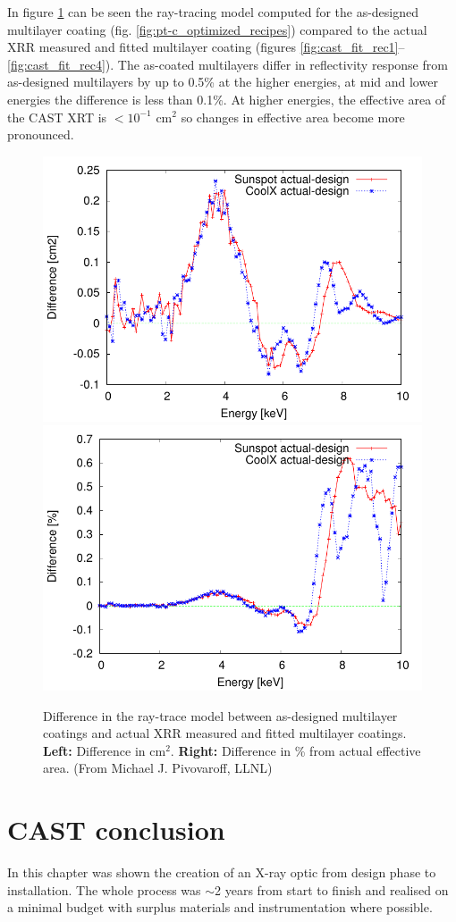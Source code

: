 In figure \ref{fig:raytracing3} can be seen the ray-tracing model computed for the as-designed multilayer coating (fig. \ref{fig:pt-c_optimized_recipes}) compared to the actual XRR measured and fitted multilayer coating (figures \ref{fig:cast_fit_rec1}--\ref{fig:cast_fit_rec4}). The as-coated multilayers differ in reflectivity response from as-designed multilayers by up to 0.5\% at the higher energies, at mid and lower energies the difference is less than 0.1\%. At higher energies, the effective area of the CAST XRT is  $< 10^{-1}$ cm$^2$ so changes in effective area become more pronounced.

\begin{figure}[htbp]
  \centering
    \includegraphics[width=0.47\linewidth]{figures/cast/raytracing_diff_cm2.pdf}
    \includegraphics[width=0.47\linewidth]{figures/cast/raytracing_diff_perc.pdf}
  \caption{\footnotesize Difference in the ray-trace model between as-designed multilayer coatings and actual XRR measured and fitted multilayer coatings.  \textbf{Left:} Difference in cm$^2$. \textbf{Right:} Difference in \% from actual effective area. (From Michael J. Pivovaroff, LLNL) }
  \label{fig:raytracing3}
\end{figure}

\section{CAST conclusion}
In this chapter was shown the creation of an X-ray optic from design phase to installation. The whole process was $\sim$2 years from start to finish and realised on a minimal budget with surplus materials and instrumentation where possible.

